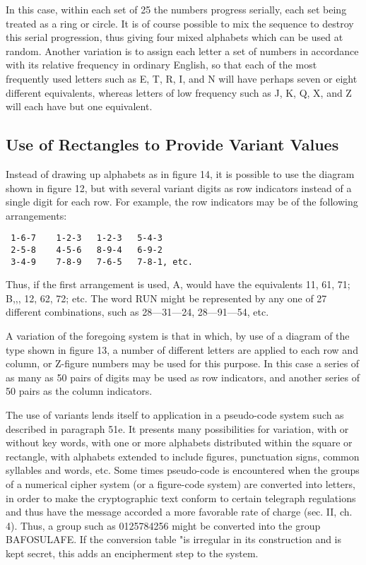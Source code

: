\mypara In this case, within each set of 25 the numbers progress serially,
each set being treated as a ring or circle. It is of course possible to mix
the sequence to destroy this serial progression, thus giving four mixed
alphabets which can be used at random.
\mypara Another variation is to assign each letter a set of numbers in accordance with its relative frequency in ordinary English, so that each of
the most frequently used letters such as E, T, R, I, and N will have
perhaps seven or eight different equivalents, whereas letters of low frequency such as J, K, Q, X, and Z will each have but one equivalent.

\subsection{Use of Rectangles to Provide Variant Values}

\mypara Instead of drawing up alphabets as in ﬁgure 14, it is possible to use
the diagram shown in ﬁgure 12, but with several variant digits as row
indicators instead of a single digit for each row. For example, the row
indicators may be of the following arrangements:

\begin{verbatim}
 1-6-7    1-2-3   1-2-3   5-4-3
 2-5-8    4-5-6   8-9-4   6-9-2
 3-4-9    7-8-9   7-6-5   7-8-1, etc.
\end{verbatim}

Thus, if the ﬁrst arrangement is used, A, would have the equivalents 11,
61, 71; B,,, 12, 62, 72; etc. The word RUN might be represented by
any one of 27 different combinations, such as 28—31—24, 28—91—54, etc.

\mypara A variation of the foregoing system is that in which, by use of a
diagram of the type shown in ﬁgure 13, a number of different letters are
applied to each row and column, or Z-ﬁgure numbers may be used for
this purpose. In this case a series of as many as 50 pairs of digits may be
used as row indicators, and another series of 50 pairs as the column
indicators.

\mypara The use of variants lends itself to application in a pseudo-code system such as described in paragraph 51e. It presents many possibilities for variation, with or without key words, with one or more alphabets distributed within the square or rectangle, with alphabets extended to include ﬁgures, punctuation signs, common syllables and words, etc. Some
times pseudo-code is encountered when the groups of a numerical cipher
system (or a ﬁgure-code system) are converted into letters, in order to
make the cryptographic text conform to certain telegraph regulations
and thus have the message accorded a more favorable rate of charge (sec.
II, ch. 4). Thus, a group such as 0125784256 might be converted into the
group BAFOSULAFE. If the conversion table "is irregular in its construction and is kept secret, this adds an encipherment step to the system.

